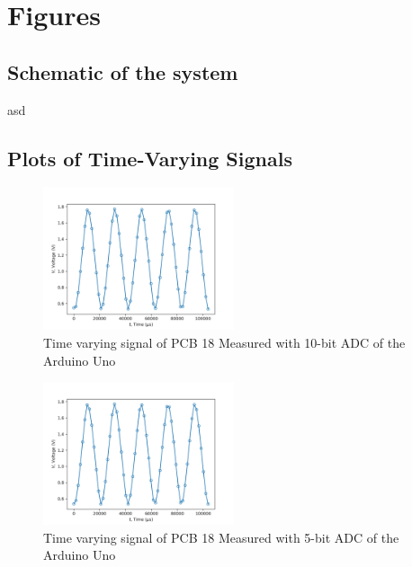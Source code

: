 \section{Figures}
\label{sec:figures}
\subsection{Schematic of the system}
asd

\subsection{Plots of Time-Varying Signals}
\begin{figure}[h]
    \centering
    \includegraphics[width=0.5\textwidth]{Sections/Figures/10bit.png}
    \caption{Time varying signal of PCB 18 Measured with 10-bit ADC of the Arduino Uno}
    \label{fig:10bit}
\end{figure}

\begin{figure}[h]
    \centering
    \includegraphics[width=0.5\textwidth]{Sections/Figures/5bit.png}
    \caption{Time varying signal of PCB 18 Measured with 5-bit ADC of the Arduino Uno}
    \label{fig:5bit}
\end{figure}